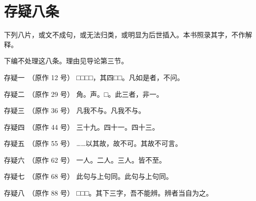 \chapter*{存疑八条}
{}

下列八片，或文不成句，或无法归类，或明显为后世插入。本书照录其字，不作解释。

下编不处理这八条。理由见导论第三节。

\begin{cunyi}{存疑一　（原作 12 号）}
□□□□，其四□□。凡如是者，不问。
\end{cunyi}

\begin{cunyi}{存疑二　（原作 29 号）}
角。声。□。此三者，非一。
\end{cunyi}

\begin{cunyi}{存疑三　（原作 36 号）}
凡我不与。凡我不与。
\end{cunyi}

\begin{cunyi}{存疑四　（原作 44 号）}
三十九。四十一。四十三。
\end{cunyi}

\begin{cunyi}{存疑五　（原作 55 号）}
……以其故，故不可。其故不可言。
\end{cunyi}

\begin{cunyi}{存疑六　（原作 62 号）}
一人。二人。三人。皆不至。
\end{cunyi}

\begin{cunyi}{存疑七　（原作 68 号）}
此句与上句同。此句与上句同。
\end{cunyi}

\begin{cunyi}{存疑八　（原作 88 号）}
□□□。其下三字，吾不能辨。辨者当自为之。
\end{cunyi}
